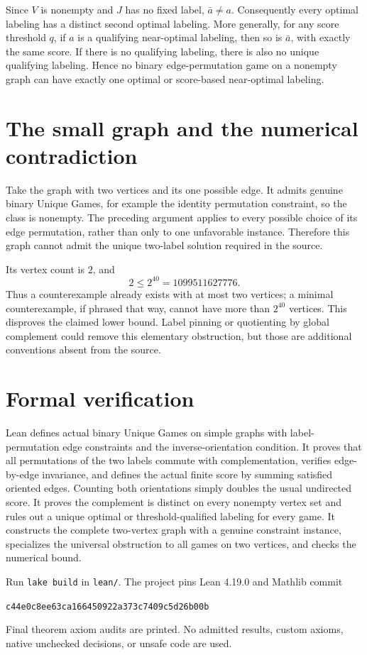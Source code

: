\documentclass[11pt]{article}
\begin{document}
Since $V$ is nonempty and $J$ has no fixed label, $\bar a\ne a$. Consequently every optimal labeling has a distinct second optimal labeling. More generally, for any score threshold $q$, if $a$ is a qualifying near-optimal labeling, then so is $\bar a$, with exactly the same score. If there is no qualifying labeling, there is also no unique qualifying labeling. Hence no binary edge-permutation game on a nonempty graph can have exactly one optimal or score-based near-optimal labeling.

\section*{The small graph and the numerical contradiction}
Take the graph with two vertices and its one possible edge. It admits genuine binary Unique Games, for example the identity permutation constraint, so the class is nonempty. The preceding argument applies to every possible choice of its edge permutation, rather than only to one unfavorable instance. Therefore this graph cannot admit the unique two-label solution required in the source.

Its vertex count is $2$, and
\[
 2\le 2^{40}=1099511627776.
\]
Thus a counterexample already exists with at most two vertices; a minimal counterexample, if phrased that way, cannot have more than $2^{40}$ vertices. This disproves the claimed lower bound. Label pinning or quotienting by global complement could remove this elementary obstruction, but those are additional conventions absent from the source.

\section*{Formal verification}
Lean defines actual binary Unique Games on simple graphs with label-permutation edge constraints and the inverse-orientation condition. It proves that all permutations of the two labels commute with complementation, verifies edge-by-edge invariance, and defines the actual finite score by summing satisfied oriented edges. Counting both orientations simply doubles the usual undirected score. It proves the complement is distinct on every nonempty vertex set and rules out a unique optimal or threshold-qualified labeling for every game. It constructs the complete two-vertex graph with a genuine constraint instance, specializes the universal obstruction to all games on two vertices, and checks the numerical bound.

Run \texttt{lake build} in \texttt{lean/}. The project pins Lean 4.19.0 and Mathlib commit
\begin{center}\small\texttt{c44e0c8ee63ca166450922a373c7409c5d26b00b}\end{center}
Final theorem axiom audits are printed. No admitted results, custom axioms, native unchecked decisions, or unsafe code are used.
\end{document}
